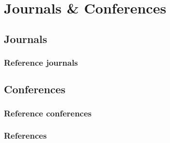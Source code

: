 \documentclass{beamer}
\begin{document}
\section{Journals \& Conferences}

\subsection{Journals}

\begin{frame}
\frametitle{Reference journals}
\end{frame}

\subsection{Conferences}

\begin{frame}
\frametitle{Reference conferences}
\end{frame}

\begin{frame}[allowframebreaks]
        \frametitle{References}
        
        
\end{frame}
\end{document}
